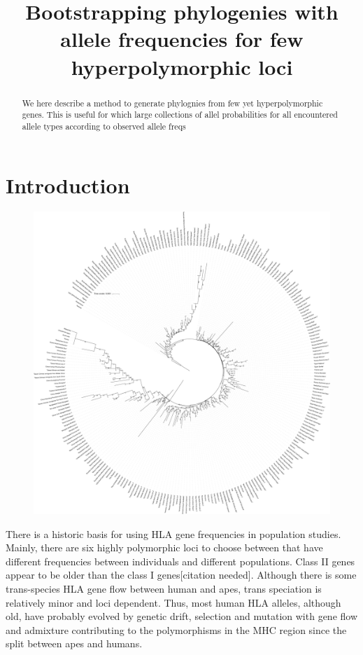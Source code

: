 \documentclass{article}
\title{Bootstrapping phylogenies with allele frequencies for few hyperpolymorphic loci}
\begin{document}
\begin{abstract}
    We here describe a method to generate phylognies from few yet hyperpolymorphic genes. This is useful for which large collections of allel
    probabilities for all encountered allele types according 
    to observed allele freqs
\end{abstract}

\section{Introduction}

\begin{figure}
    \centering
    \includegraphics[width=\textwidth]{Figures/maj_AB_nj_246_99.pdf}
    \label{treeAB}
\end{figure}

There is a historic basis for using HLA gene frequencies in population studies. Mainly, there are six highly polymorphic
loci to choose between that have different frequencies between individuals and different populations. Class II genes
appear to be older than the class I genes[citation needed]. Although there is some trans-species HLA gene flow between human and apes,
trans speciation is relatively minor and loci dependent. Thus, most human HLA alleles, although old, have probably
evolved by genetic drift, selection and mutation with gene flow and admixture contributing to the polymorphisms in the
MHC region since the split between apes and humans.
\end{document}
